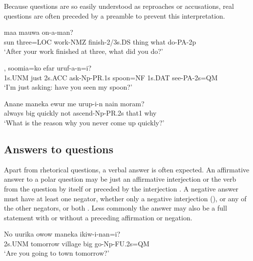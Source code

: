 Because questions are so easily understood as reproaches or accusations, real questions are often preceded by a preamble to prevent this interpretation.

\ea%
\label{ex:x1210}
\gll [Ama  arow=pa  mauw-owa  weeser-eya]  maa  mauwa  on-a-man? \\
 sun  three=LOC  work-NMZ  finish-2/3s.DS  thing  what  do-PA-2p     \\
\glt `After your work finished at three, what did you do?'
\z





\ea%
\label{ex:x1211}
,  soomia=ko  efar uruf-a-n=i? \\
1s.UNM  just  2s.ACC  ask-Np-PR.1s  spoon=NF  1s.DAT  see-PA-2s=QM    \\
\glt `I'm just asking: have you seen my spoon?'
\z









\ea%
\label{ex:x1355}
\gll Anane  maneka  ewur  me  urup-i-n  nain  moram? \\
 always  big  quickly  not  ascend-Np-PR.2s  that1  why     \\
\glt `What is the reason why you never come up quickly?'
\z





\subsection{Answers to questions}
{}
Apart from rhetorical questions, a verbal answer is often expected. An affirmative answer to a polar question  may be just an affirmative interjection  or the verb from the question by itself or preceded by the interjection . A negative answer must have at least one negator, whether only a negative interjection (), or any of the other negators, or both . Less commonly the answer may also be a full statement with or without a preceding affirmation   or negation.

\ea%
\label{ex:x1216}
\gll No  uurika  owow  maneka  ikiw-i-nan=i? \\
2s.UNM  tomorrow  village  big  go-Np-FU.2s=QM      \\
\glt `Are you going to town tomorrow?'
\z




